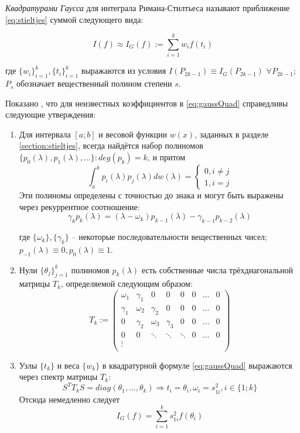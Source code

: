 \emph{Квадратурами Гаусса} для интеграла Римана-Стилтьеса называют приближение \eqref{eq:stieltjes} суммой следующего вида:

\begin{equation}\label{eq:gaussQuad}
    I(f) \approx I_G(f) := \sum_{i=1}^k w_i f(t_i)
\end{equation}

где $ \{w_i\}_{i=1}^k, \{t_i\}_{i=1}^k $ выражаются из условия $ I(P_{2k-1}) \equiv I_G(P_{2k-1}) $ $ \forall P_{2k-1} $; $ P_{s} $ обозначает вещественный полином степени $ s $.

Показано \cite{golub2013matcomput}, что для неизвестных коэффициентов в \eqref{eq:gaussQuad} справедливы следующие утверждения:

\begin{enumerate}
    \item Для интервала $ [a;b] $ и весовой функции $ w(x) $, заданных в разделе \ref{section:stieltjes}, всегда найдётся набор полиномов $ \{ p_0(\lambda), p_1(\lambda), ... \}: deg(p_k)=k $, и притом
    \[ \int_a^b p_i(\lambda)p_j(\lambda) dw(\lambda) = \begin{cases}
        0, i \ne j \\
        1, i = j
    \end{cases} \]
Эти полиномы определены с точностью до знака и могут быть выражены через рекуррентное соотношение:
\begin{equation}\label{eq:gaussRecur}
    \gamma_k p_k(\lambda) = (\lambda-\omega_k) p_{k-1}(\lambda) - \gamma_{k-1}p_{k-2}(\lambda)
\end{equation}

где $ \{\omega_k\}, \{\gamma_k\} $ -- некоторые последовательности вещественных чисел; $ p_{-1}(\lambda) \equiv 0, p_0(\lambda) \equiv 1 $.

\item Нули $ \{ \theta_j \}_{j=1}^k $ полиномов $ p_k(\lambda) $ есть собственные числа трёхдиагональной матрицы $ T_k $, определяемой следующим образом:
\[ T_k := \begin{pmatrix}
    \omega_1 & \gamma_1 & 0 & 0 & 0 & 0 & \dots & 0 \\
    \gamma_1 & \omega_2 & \gamma_2 & 0 & 0 & 0 & \dots & 0 \\
    0 & \gamma_2 & \omega_3 & \gamma_3 & 0 & 0 & \dots & 0 \\
    0 & 0 & \ddots & \ddots & \ddots & 0 & \dots & 0 \\
    \vdots \\
\end{pmatrix} \]

\item Узлы $\{t_k\} $ и веса $ \{w_k\}$ в квадратурной формуле \eqref{eq:gaussQuad} выражаются через спектр матрицы $ T_k $:
\begin{equation}
    S^T T_k S = diag(\theta_1, \dots, \theta_k) \Rightarrow t_i = \theta_i, \omega_i = s_{1i}^2, i \in \{ 1;k \}
\end{equation}
Отсюда немедленно следует
\begin{equation}\label{eq:gaussSpector}
    \boxed{ I_G(f) = \sum_{i=1}^k s_{1i}^2 f(\theta_i) }
\end{equation}
\end{enumerate}

